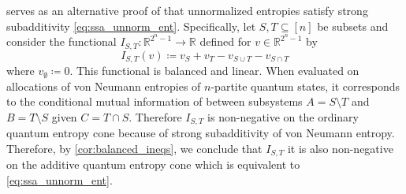 \documentclass[notitlepage, 10pt]{article}
\begin{document}
\begin{rem}
     serves as an alternative proof of that unnormalized entropies satisfy strong subadditivity \cref{eq:ssa_unnorm_ent}.
    Specifically, let $S, T \subseteq [n]$ be subsets and consider the functional $I_{S,T} : \mathbb R^{2^n-1} \to \mathbb R$ defined for $v \in \mathbb R^{2^n-1}$ by
    \begin{equation}
        I_{S,T}(v) \coloneqq v_{S} + v_{T} - v_{S \cup T} - v_{S \cap T}
    \end{equation}
    where $v_{\emptyset} \coloneqq 0$.
    This functional is balanced and linear.
    When evaluated on allocations of von Neumann entropies of $n$-partite quantum states, it corresponds to the conditional mutual information of between subsystems $A = S \setminus T$ and $B = T \setminus S$ given $C = T \cap S$.
    Therefore $I_{S,T}$ is non-negative on the ordinary quantum entropy cone because of strong subadditivity of von Neumann entropy.
    Therefore, by \cref{cor:balanced_ineqs}, we conclude that $I_{S,T}$ it is also non-negative on the additive quantum entropy cone which is equivalent to \cref{eq:ssa_unnorm_ent}.
\end{rem}
\end{document}
